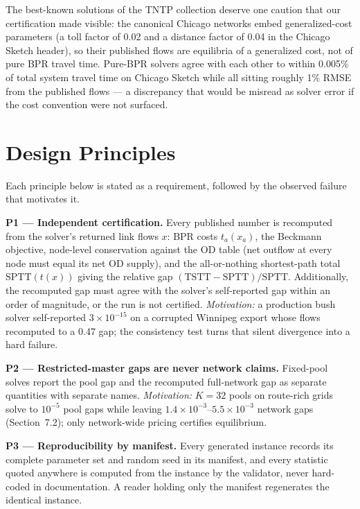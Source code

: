 \documentclass[11pt]{article}
\begin{document}
The best-known solutions of the TNTP collection deserve one caution that
our certification made visible: the canonical Chicago networks embed
generalized-cost parameters (a toll factor of 0.02 and a distance factor of
0.04 in the Chicago Sketch header), so their published flows are equilibria
of a generalized cost, not of pure BPR travel time. Pure-BPR solvers agree
with each other to within 0.005\% of total system travel time on Chicago
Sketch while all sitting roughly 1\% RMSE from the published flows --- a
discrepancy that would be misread as solver error if the cost convention
were not surfaced.

\section{Design Principles}

Each principle below is stated as a requirement, followed by the observed
failure that motivates it.

\textbf{P1 --- Independent certification.} Every published number is
recomputed from the solver's returned link flows $x$: BPR costs
$t_a(x_a)$, the Beckmann objective, node-level conservation against the OD
table (net outflow at every node must equal its net OD supply), and the
all-or-nothing shortest-path total $\mathrm{SPTT}(t(x))$ giving the
relative gap $(\mathrm{TSTT}-\mathrm{SPTT})/\mathrm{SPTT}$. Additionally,
the recomputed gap must agree with the solver's self-reported gap within an
order of magnitude, or the run is not certified. \emph{Motivation:} a
production bush solver self-reported $3\times10^{-15}$ on a corrupted
Winnipeg export whose flows recomputed to a 0.47 gap; the consistency test
turns that silent divergence into a hard failure.

\textbf{P2 --- Restricted-master gaps are never network claims.} Fixed-pool
solves report the pool gap and the recomputed full-network gap as separate
quantities with separate names. \emph{Motivation:} $K{=}32$ pools on
route-rich grids solve to $10^{-5}$ pool gaps while leaving
$1.4\times10^{-3}$--$5.5\times10^{-3}$ network gaps
(Section~7.2); only network-wide pricing certifies equilibrium.

\textbf{P3 --- Reproducibility by manifest.} Every generated instance
records its complete parameter set and random seed in its manifest, and
every statistic quoted anywhere is computed from the instance by the
validator, never hard-coded in documentation. A reader holding only the
manifest regenerates the identical instance.
\end{document}
